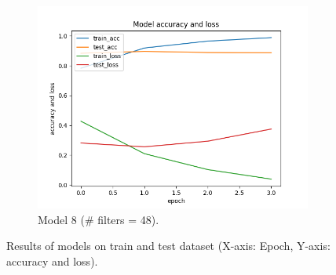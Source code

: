 \documentclass[11pt]{article}
\begin{document}
\begin{figure}[h!]
\begin{subfigure}{0.32\textwidth}
         \includegraphics[width=\textwidth]{model8.png}
         \caption{Model 8 (\# filters = 48).}
         \label{fig:model8}
\end{subfigure}
\caption{Results of models on train and test dataset (X-axis: Epoch, Y-axis: accuracy and loss).}
\label{fig:accandlossmodel_overfitting}
\end{figure}
\end{document}
